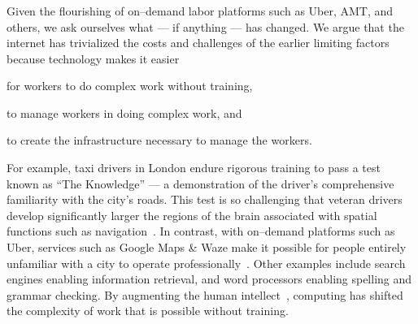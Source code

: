 \documentclass[trackingWork]{subfiles}
\begin{document}
{%

}
\subsubsection{\whatchanged}
\begin{comment}
  mangeerial overhead limits, so what's different
  more people can now do complex work without training (more complex)
  parts of management can be automated (more firms)
  cheaper to create the infrastructure (more complex)
\end{comment}

Given the flourishing of on--demand labor platforms such as
Uber, AMT, and others, we ask ourselves
what --- if anything --- has changed.
We argue that
the internet has trivialized
the costs and challenges of the earlier limiting factors
because technology makes it easier
\begin{inlinelist}
  \item for workers to do complex work without training,
  \item to manage workers in doing complex work, and 
  \item to create the infrastructure necessary to manage the workers.
\end{inlinelist}

For example, taxi drivers in London endure rigorous training to pass a test known as ``The Knowledge''
--- a demonstration of the driver's comprehensive familiarity with the city's roads.
This test is so challenging that veteran drivers develop significantly larger
the regions of the brain associated with spatial functions such as navigation~\cite{Maguire11042000,Maguire2894,Skok:1999:KML:299513.299625,skok2000managing,Woollett1407,woollett2011acquiring}.
In contrast, with on--demand platforms such as Uber, services such as Google Maps \& Waze make it possible for
people entirely unfamiliar with a city
to operate professionally~\cite{silva2013traffic,hind2014outsmarting}.
Other examples include search engines enabling information retrieval, and
word processors enabling spelling and grammar checking.
By augmenting the human intellect~\cite{engelbart2001augmenting},
computing has shifted the complexity of work that is possible without training.
\end{document}
